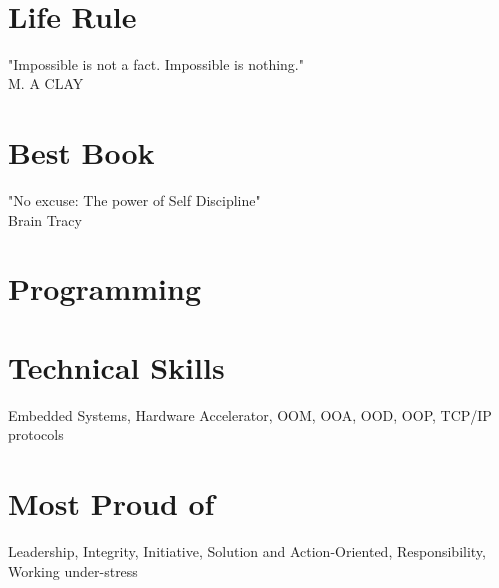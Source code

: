 \documentclass[]{cv-class}
\begin{document}
\begin{aside}

  	~

\vspace{4.15cm}
  \section{Life Rule}
    "Impossible is not a fact. Impossible is nothing."\\
M. A CLAY
    ~
\section{Best Book}
    
"No excuse: The power of Self Discipline"\\
Brain Tracy%
    ~

  \section{Programming}
\section{Technical Skills}  
 Embedded Systems, Hardware Accelerator, OOM, OOA, OOD, OOP,  TCP/IP protocols  %
  \section{Most Proud of}
Leadership, Integrity, Initiative,  Solution and Action-Oriented, Responsibility, Working under-stress%

\end{aside}
\end{document}
